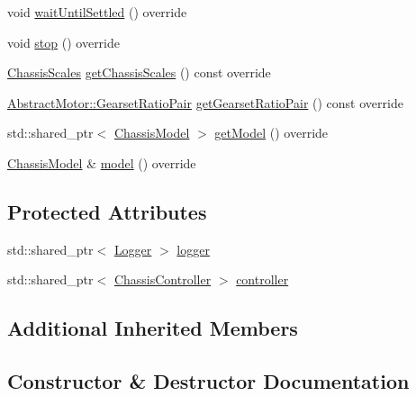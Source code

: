 \begin{DoxyCompactItemize}
\item 
void \mbox{\hyperlink{classokapi_1_1DefaultOdomChassisController_a44599379129060bdb44e6f603ee5777b}{wait\+Until\+Settled}} () override
\item 
void \mbox{\hyperlink{classokapi_1_1DefaultOdomChassisController_af6a98415e2c4e17dfec77e215efb1a41}{stop}} () override
\item 
\mbox{\hyperlink{classokapi_1_1ChassisScales}{Chassis\+Scales}} \mbox{\hyperlink{classokapi_1_1DefaultOdomChassisController_afa07913b30d47c790fcdce8c2b85a468}{get\+Chassis\+Scales}} () const override
\item 
\mbox{\hyperlink{structokapi_1_1AbstractMotor_1_1GearsetRatioPair}{Abstract\+Motor\+::\+Gearset\+Ratio\+Pair}} \mbox{\hyperlink{classokapi_1_1DefaultOdomChassisController_a6912dbe99776f79fb3a6990e2fbea2ff}{get\+Gearset\+Ratio\+Pair}} () const override
\item 
std\+::shared\+\_\+ptr$<$ \mbox{\hyperlink{classokapi_1_1ChassisModel}{Chassis\+Model}} $>$ \mbox{\hyperlink{classokapi_1_1DefaultOdomChassisController_a83e8bf7115086c331ada990ceb872bf1}{get\+Model}} () override
\item 
\mbox{\hyperlink{classokapi_1_1ChassisModel}{Chassis\+Model}} \& \mbox{\hyperlink{classokapi_1_1DefaultOdomChassisController_aa917086153b6298bf7792fd3b31ac240}{model}} () override
\end{DoxyCompactItemize}
\subsection*{Protected Attributes}
\begin{DoxyCompactItemize}
\item 
std\+::shared\+\_\+ptr$<$ \mbox{\hyperlink{classokapi_1_1Logger}{Logger}} $>$ \mbox{\hyperlink{classokapi_1_1DefaultOdomChassisController_a1e34483ae1bcef368d80b69f54a3b091}{logger}}
\item 
std\+::shared\+\_\+ptr$<$ \mbox{\hyperlink{classokapi_1_1ChassisController}{Chassis\+Controller}} $>$ \mbox{\hyperlink{classokapi_1_1DefaultOdomChassisController_a0513b32bd09e7af2b82a5d67895b6165}{controller}}
\end{DoxyCompactItemize}
\subsection*{Additional Inherited Members}


\subsection{Constructor \& Destructor Documentation}
\mbox{\label{classokapi_1_1DefaultOdomChassisController_ab0b6772507b1e7dc25aea0612ffffbab}} 
